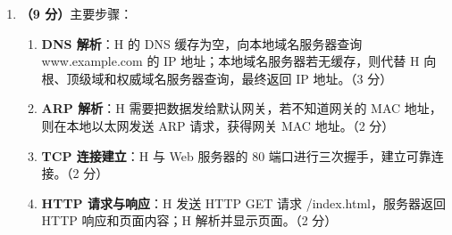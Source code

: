 \documentclass[a4paper,11pt]{article}
\begin{document}
\begin{enumerate}[start=13, label=\textbf{\arabic*.}, leftmargin=2.4em, itemsep=0.45em]
\item \textbf{（9 分）}主要步骤：
\begin{enumerate}[label=（\arabic*）, leftmargin=2.2em, itemsep=1pt]
  \item \textbf{DNS 解析}：H 的 DNS 缓存为空，向本地域名服务器查询 www.example.com 的 IP 地址；本地域名服务器若无缓存，则代替 H 向根、顶级域和权威域名服务器查询，最终返回 IP 地址。\hfill（3 分）
  \item \textbf{ARP 解析}：H 需要把数据发给默认网关，若不知道网关的 MAC 地址，则在本地以太网发送 ARP 请求，获得网关 MAC 地址。\hfill（2 分）
  \item \textbf{TCP 连接建立}：H 与 Web 服务器的 80 端口进行三次握手，建立可靠连接。\hfill（2 分）
  \item \textbf{HTTP 请求与响应}：H 发送 HTTP GET 请求 /index.html，服务器返回 HTTP 响应和页面内容；H 解析并显示页面。\hfill（2 分）
\end{enumerate}

\end{enumerate}

\end{document}
